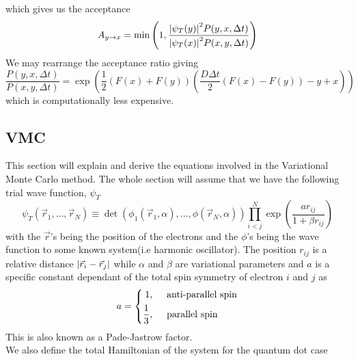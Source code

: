 \documentclass[a4paper, hidelinks, 10pt]{article}
\let\oldsubsection\subsection
\renewcommand{\subsection}[1]{\centering \oldsubsection{{#1}} \justifying}
\newcommand{\rarr}{\rightarrow} %
\newcommand{\ufij}[3]{#1_{#2\rarr#3}}
\begin{document}
    which gives us the acceptance
        \begin{equation}
            \ufij{A}{y}{x} = \min\left(1, \frac{\abs{\psi_T(y)}^2P(y,x,\Delta
            t)} {\abs{\psi_T(x)}^2P(x,y,\Delta t)}\right)
            \label{eq:acceptanceImportance}
        \end{equation}
    We may rearrange the acceptance ratio giving
        \begin{equation}
            \frac{P(y,x,\Delta t)}{P(x,y,\Delta t)} = \exp(\frac{1}{2}
            \left(F(x)+F(y)\right) \left(\frac{D\Delta t}{2}\left(F(x) -
            F(y)\right) - y + x\right))
            \label{eq:accRearr}
        \end{equation}
    which is computationally less expensive.

\subsection{VMC}
\label{sub:vmc}
    This section will explain and derive the equations involved in the
    Variational Monte Carlo method. The whole section will assume that we have
    the following trial wave function, $\psi_T$
        \begin{equation}
            \psi_T(\vec{r}_1,\dots,\vec{r}_N) \equiv
            \det(\phi_1(\vec{r}_1,\alpha),\dots,\phi(\vec{r}_N,\alpha))
            \prod^N_{i<j} \exp(\frac{ar_{ij}}{1+\beta r_{ij}})
            \label{eq:psiT}
        \end{equation}
    with the $\vec{r}$'s being the position of the electrons and the $\phi$'s
    being the wave function to some known system(i.e harmonic oscillator). The
    position $r_{ij}$ is a relative distance $\abs{\vec{r}_i-\vec{r}_j}$ while
    $\alpha$ and $\beta$ are variational parameters and $a$ is a specific
    constant dependant of the total spin symmetry of electron $i$ and $j$ as
        \begin{equation}
            a = \left\{
                    \begin{aligned}
                        1, & \indent \text{anti-parallel spin} \\
                        \frac{1}{3}, & \indent \text{parallel spin}
                    \end{aligned}
                \right.
            \label{eq:a}
        \end{equation}
    This is also known as a Pade-Jastrow factor. \\
    We also define the total Hamiltonian of the system for the quantum dot case
\end{document}
